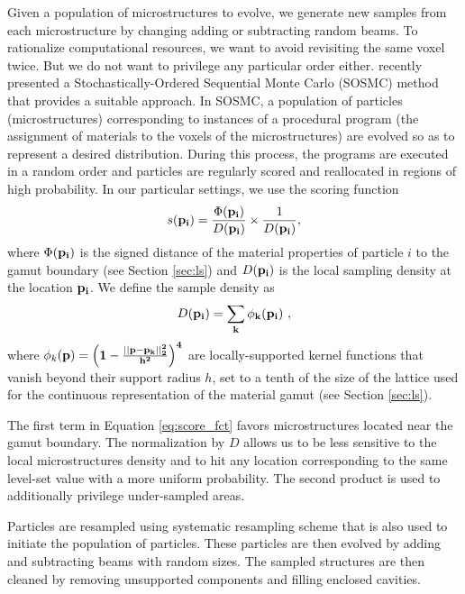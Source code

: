 Given a population of microstructures to evolve, we generate new samples from each microstructure by changing adding or subtracting random beams.
To rationalize computational resources, we want to avoid revisiting the same voxel twice. But we do not want to privilege any particular order either.
\citet{Ritchie2015SOCM} recently presented a Stochastically-Ordered Sequential Monte Carlo (SOSMC) method that provides a suitable approach.
In SOSMC, a population of particles (microstructures) corresponding to instances of a procedural program (the assignment of materials to the voxels of the microstructures)
are evolved so as to represent a desired distribution.
During this process, the programs are executed in a random order and particles are regularly scored and reallocated in regions of high probability.
In our particular settings, we use the scoring function
\begin{equation}
s(\mathbf{p_i}) = \frac{\Phi(\bf p_i)}{D(\bf p_i)} \times \frac{1}{D(\bf p_i)},
\label{eq:score_fct}
\end{equation}
where $\Phi(\bf p_i)$ is the signed distance of the material properties of particle $i$ to the gamut boundary (see Section \ref{sec:ls}) and $D(\bf p_i)$ is the local sampling density at the location $\bf p_i$. We define the sample density as
\begin{equation}
D(\bf p_i)=\sum_{k}\phi_{k}(\bf p_i)\ ,
\end{equation}
where $\phi_{k}(\bf p)=\left(1-\frac{||\bf p-\bf p_{k}||^{2}_{2}}{h^{2}}\right)^{4}$ are locally-supported kernel functions that vanish beyond their support radius $h$, set to a tenth of the size of the lattice used for the continuous representation of the material gamut (see Section \ref{sec:ls}).

The first term in Equation \ref{eq:score_fct} favors microstructures located near the gamut boundary. The normalization by $D$ allows us to be less sensitive to the local microstructures density and to hit any location corresponding to the same level-set value with a more uniform probability. The second product is used to additionally privilege under-sampled areas.

Particles are resampled using systematic resampling scheme \citep{Douc05resamplingSchmes} that is also used to initiate the population of particles. These particles are then evolved by adding and subtracting beams with random sizes. The sampled structures are then cleaned by removing unsupported components and filling enclosed cavities.

